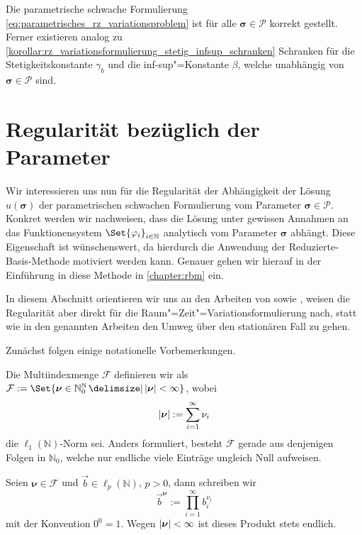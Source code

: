 \documentclass[../main.tex]{subfiles}
\begin{document}
\begin{Korollar}
\label{korollar:parametrisches_rz_variationsproblem_sachgemaess}
    Die parametrische schwache Formulierung \cref{eq:parametrisches_rz_variationsproblem} ist für alle $\bm\sigma \in \mathcal P$ korrekt gestellt.
    Ferner existieren analog zu \cref{korollar:rz_variationsformulierung_stetig_infsup_schranken} Schranken für die Stetigkeitskonstante $\gamma_{b}$ und die inf-sup"=Konstante $\beta$, welche unabhängig von $\bm \sigma \in \mathcal P$ sind.
\end{Korollar}


\section{Regularität bezüglich der Parameter} %
\label{section:regularitaet_bezueglich_der_parameter}

Wir interessieren uns nun für die Regularität der Abhängigkeit der Lösung $u(\bm\sigma)$ der parametrischen schwachen Formulierung vom Parameter $\bm \sigma \in \mathcal P$.
Konkret werden wir nachweisen, dass die Lösung unter gewissen Annahmen an das Funktionensystem $\Set{\varphi_{i}}_{i \in \mathbb{N}}$ analytisch vom Parameter $\bm \sigma$ abhängt.
Diese Eigenschaft ist wünschenswert, da hierdurch die Anwendung der Reduzierte-Basis-Methode motiviert werden kann.
Genauer gehen wir hierauf in der Einführung in diese Methode in \cref{chapter:rbm} ein.

In diesem Abschnitt orientieren wir uns an den Arbeiten von \textcite{Cohen:2010kz,Cohen:2011jp} sowie \textcite{Kunoth:2013ef}, weisen die Regularität aber direkt für die Raum"=Zeit"=Variationsformulierung nach, statt wie in den genannten Arbeiten den Umweg über den stationären Fall zu gehen.

Zunächst folgen einige notationelle Vorbemerkungen.
\begin{Bemerkung}
    Die Multiindexmenge $\mathcal F$ definieren wir als $\mathcal F := \Set{ \bm\nu \in \mathbb{N}^{\mathbb{N}}_{0} \given \abs{\bm\nu} < \infty }$, wobei
    \begin{equation}
        \lvert\bm\nu\rvert := \sum_{i = 1}^{\infty} \nu_{i}
    \end{equation}
    die $\ell_{1}(\mathbb{N})$-Norm sei.
    Anders formuliert, besteht $\mathcal F$ gerade aus denjenigen Folgen in $\mathbb{N}_{0}$, welche nur endliche viele Einträge ungleich Null aufweisen.

    Seien $\bm\nu \in \mathcal F$ und $\vec{b} \in \ell_{p}(\mathbb{N})$, $p > 0$, dann schreiben wir
    \begin{equation}
        \vec{b}^{\bm\nu} := \prod_{i = 1}^{\infty} b_{i}^{\nu_{i}}
    \end{equation}
    mit der Konvention $0^{0} = 1$.
    Wegen $\lvert\bm\nu\rvert < \infty$ ist dieses Produkt stets endlich.
\end{Bemerkung}
\end{document}
